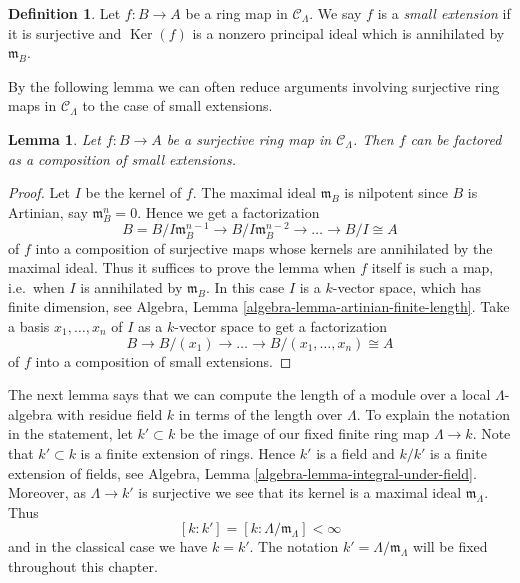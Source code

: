 \documentclass{stacks-project}
\theoremstyle{plain}
\newtheorem{lemma}[subsection]{Lemma}
\theoremstyle{definition}
\newtheorem{definition}[subsection]{Definition}
\theoremstyle{remark}
\numberwithin{equation}{subsection}
\def\Ker{\mathop{\mathrm{Ker}}}
\begin{document}
\begin{definition}
\label{definition-small-extension}
Let $f: B \to A$ be a ring map in $\mathcal{C}_\Lambda$.  We say $f$
is a {\it small extension} if it is surjective and $\Ker(f)$ is a nonzero
principal ideal which is annihilated by $\mathfrak{m}_B$.
\end{definition}

\noindent
By the following lemma we can often reduce arguments involving surjective ring
maps in $\mathcal{C}_\Lambda$ to the case of small extensions.

\begin{lemma}
\label{lemma-factor-small-extension}
Let $f: B \to A$ be a surjective ring map in $\mathcal{C}_\Lambda$.
Then $f$ can be factored as a composition of small extensions.
\end{lemma}

\begin{proof}
Let $I$ be the kernel of $f$.  The maximal ideal $\mathfrak{m}_B$ is
nilpotent since $B$ is Artinian, say $\mathfrak{m}_B^n = 0$. Hence we get a
factorization
$$
B = B/I\mathfrak{m}_B^{n-1} \to B/I\mathfrak{m}_B^{n-2} \to
\ldots \to B/I \cong A
$$
of $f$ into a composition of surjective maps whose kernels are annihilated by
the maximal ideal.  Thus it suffices to prove the lemma when $f$ itself is such
a map, i.e.\ when $I$ is annihilated by $\mathfrak{m}_B$. In this case
$I$ is a $k$-vector space, which has finite dimension, see
Algebra, Lemma \ref{algebra-lemma-artinian-finite-length}.
Take a basis $x_1, \ldots, x_n$ of $I$ as a $k$-vector space to get a
factorization
$$
B \to B/(x_1) \to \ldots \to  B/(x_1, \ldots, x_n) \cong  A
$$
of $f$ into a composition of small extensions.
\end{proof}

\noindent
The next lemma says that we can compute the length of a module over a local
$\Lambda$-algebra with residue field $k$ in terms of the length over
$\Lambda$. To explain the notation in the statement, let $k' \subset k$
be the image of our fixed finite ring map $\Lambda \to k$. Note
that $k' \subset k$ is a finite extension of rings. Hence $k'$ is a field
and $k/k'$ is a finite extension of fields, see
Algebra, Lemma \ref{algebra-lemma-integral-under-field}.
Moreover, as $\Lambda \to k'$ is surjective we see that its kernel
is a maximal ideal $\mathfrak m_\Lambda$. Thus
\begin{equation}
\label{equation-k-prime}
[k : k'] = [k : \Lambda/\mathfrak m_\Lambda] < \infty
\end{equation}
and in the classical case we have $k = k'$. The notation
$k' = \Lambda/\mathfrak m_\Lambda$ will be fixed throughout this chapter.
\end{document}
